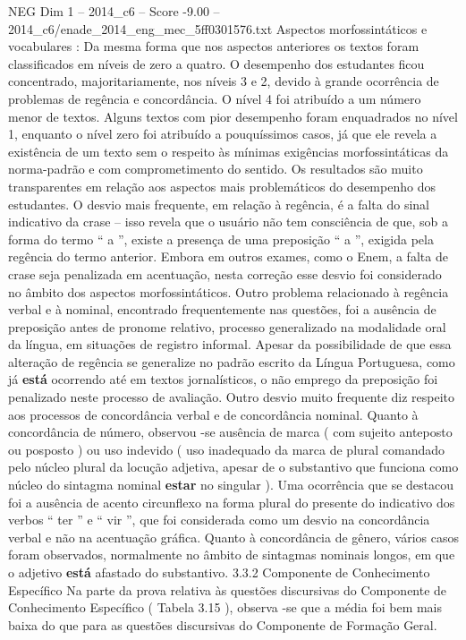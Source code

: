 \begin{textsample}{NEG Dim 1 – 2014\_c6 – Score -9.00 – 2014\_c6/enade\_2014\_eng\_mec\_5ff0301576.txt}
Aspectos morfossintáticos e vocabulares : Da mesma forma que nos aspectos anteriores os textos foram classificados em níveis de zero a quatro.
O desempenho dos estudantes ficou concentrado, majoritariamente, nos níveis 3 e 2, devido à grande ocorrência de problemas de regência e concordância.
O nível 4 foi atribuído a um número menor de textos.
Alguns textos com pior desempenho foram enquadrados no nível 1, enquanto o nível zero foi atribuído a pouquíssimos casos, já que ele revela a existência de um texto sem o respeito às mínimas exigências morfossintáticas da norma-padrão e com comprometimento do sentido.
Os resultados são muito transparentes em relação aos aspectos mais problemáticos do desempenho dos estudantes.
O desvio mais frequente, em relação à regência, é a falta do sinal indicativo da crase – isso revela que o usuário não tem consciência de que, sob a forma do termo “ a ”, existe a presença de uma preposição “ a ”, exigida pela regência do termo anterior.
Embora em outros exames, como o Enem, a falta de crase seja penalizada em acentuação, nesta correção esse desvio foi considerado no âmbito dos aspectos morfossintáticos.
Outro problema relacionado à regência verbal e à nominal, encontrado frequentemente nas questões, foi a ausência de preposição antes de pronome relativo, processo generalizado na modalidade oral da língua, em situações de registro informal.
Apesar da possibilidade de que essa alteração de regência se generalize no padrão escrito da Língua Portuguesa, como já \textbf{está} ocorrendo até em textos jornalísticos, o não emprego da preposição foi penalizado neste processo de avaliação.
Outro desvio muito frequente diz respeito aos processos de concordância verbal e de concordância nominal.
Quanto à concordância de número, observou -se ausência de marca ( com sujeito anteposto ou posposto ) ou uso indevido ( uso inadequado da marca de plural comandado pelo núcleo plural da locução adjetiva, apesar de o substantivo que funciona como núcleo do sintagma nominal \textbf{estar} no singular ).
Uma ocorrência que se destacou foi a ausência de acento circunflexo na forma plural do presente do indicativo dos verbos “ ter ” e “ vir ”, que foi considerada como um desvio na concordância verbal e não na acentuação gráfica.
Quanto à concordância de gênero, vários casos foram observados, normalmente no âmbito de sintagmas nominais longos, em que o adjetivo \textbf{está} afastado do substantivo. 3.3.2 Componente de Conhecimento Específico Na parte da prova relativa às questões discursivas do Componente de Conhecimento Específico ( Tabela 3.15 ), observa -se que a média foi bem mais baixa do que para as questões discursivas do Componente de Formação Geral.

\end{textsample}
